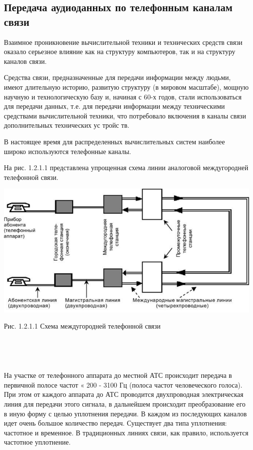 \documentclass[a4paper]{report}
\begin{document}
\subsection{Передача аудиоданных по телефонным каналам связи}

Взаимное проникновение вычислительной техники и технических средств связи оказало серьезное влияние как на структуру компьютеров, так и на структуру каналов связи.

Средства связи, предназначенные для передачи информации между людьми, имеют длительную историю, развитую структуру (в мировом масштабе), мощную научную и технологическую базу и, начиная с 60-х годов, стали использоваться для передачи данных, т.е. для передачи информации между техническими средствами вычислительной техники, что потребовало включения в каналы связи дополнительных технических ус тройс тв.

В настоящее время для распределенных вычислительных систем наиболее широко используются телефонные каналы.

На рис. 1.2.1.1 представлена упрощенная схема линии аналоговой междугородней телефонной связи.

\includegraphics[scale=1.4]{66}
{\centering\caption{Рис. 1.2.1.1 Схема междугородней телефонной связи}\\}
~

На участке от телефонного аппарата до местной АТС происходит передача в первичной полосе частот « 200 - 3100 Гц (полоса частот человеческого голоса). При этом от каждого аппарата до АТС проводится двухпроводная электрическая линия для передачи этого сигнала, в дальнейшем происходит преобразование его в иную форму с целью уплотнения передачи. В каждом из последующих каналов идет очень большое количество передач. Существует два типа уплотнения: частотное и временное. В традиционных линиях связи, как правило, используется частотное уплотнение.
\end{document}
